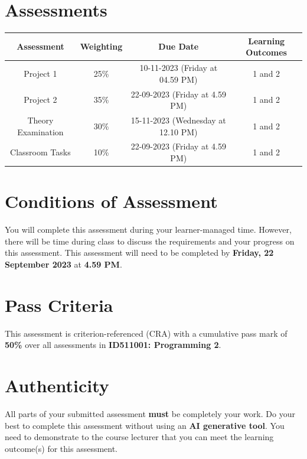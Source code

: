 \documentclass{article}
\begin{document}
\section*{Assessments}
\renewcommand{\arraystretch}{1.5}
\begin{tabular}{|c|c|c|c|}
	\hline
	\textbf{Assessment}                                 & \textbf{Weighting} & \textbf{Due Date}            & \textbf{Learning Outcomes} \\ \hline
	\small Project 1 & \small 25\%        & \small 10-11-2023 (Friday at 04.59 PM)  & \small 1 and 2                   \\ \hline
	\small Project 2 & \small 35\%        & \small 22-09-2023 (Friday at 4.59 PM)   & \small 1 and 2                   \\ \hline
	\small Theory Examination                        & \small 30\%        & \small 15-11-2023 (Wednesday at 12.10 PM)  & \small 1 and 2                   \\ \hline
	\small Classroom Tasks                      & \small 10\%        & \small 22-09-2023 (Friday at 4.59 PM)  & \small 1 and 2                   \\ \hline
\end{tabular} 


\section*{Conditions of Assessment}
You will complete this assessment during your learner-managed time. However, there will be time during class to discuss the requirements and your progress on this assessment. This assessment will need to be completed by \textbf{Friday, 22 September 2023} at \textbf{4.59 PM}.

\section*{Pass Criteria}
This assessment is criterion-referenced (CRA) with a cumulative pass mark of \textbf{50\%} over all assessments in \textbf{ID511001: Programming 2}.

\section*{Authenticity}
All parts of your submitted assessment \textbf{must} be completely your work. Do your best to complete this assessment without using an \textbf{AI generative tool}. You need to demonstrate to the course lecturer that you can meet the learning outcome(s) for this assessment. \\
 
\end{document}
